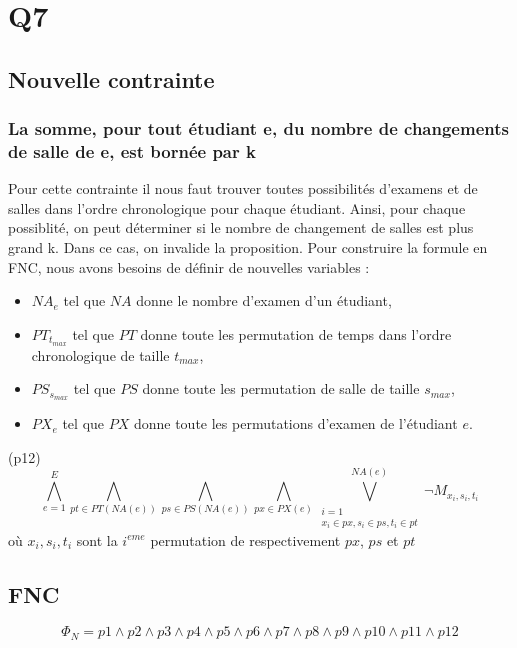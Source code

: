 \documentclass[a4paper,11pt]{article}
\begin{document}
\section{Q7}
\subsection{Nouvelle contrainte}
\subsubsection{La somme, pour tout étudiant e, du nombre de changements de salle de e, est bornée par k}
Pour cette contrainte il nous faut trouver toutes possibilités d'examens et de salles dans l'ordre chronologique pour chaque étudiant. Ainsi, pour chaque possiblité, on peut déterminer si le nombre de changement de salles est plus grand k. Dans ce cas, on invalide la proposition.
Pour construire la formule en FNC, nous avons besoins de définir de nouvelles variables :  
\begin{itemize}
	\item \( NA_{e}\) tel que $NA$ donne le nombre d'examen d'un étudiant,
	\item \( PT_{t_{max}}\) tel que $PT$ donne toute les permutation de temps dans l'ordre chronologique de taille $t_{max}$,
	\item \( PS_{s_{max}}\) tel que $PS$ donne toute les permutation de salle de taille $s_{max}$,
	\item \( PX_{e}\) tel que $PX$ donne toute les permutations d'examen de l'étudiant $e$.
\end{itemize}

(p12)
\begin{displaymath}
	\bigwedge\limits_{e=1}^{E}
	\bigwedge\limits_{pt \in PT(NA(e))}^{}
	\bigwedge\limits_{ps \in PS(NA(e))}^{}
	\bigwedge\limits_{px \in PX(e)}^{}
	\bigvee\limits_{\substack{i=1 \\ x_{i} \in px, s_{i} \in ps, t_{i} \in pt }}^{NA(e)} 
	\neg M_{x_{i}, s_{i}, t_{i}}
\end{displaymath}
où $ x_{i}, s_{i}, t_{i} $ sont la $i^{eme}$ permutation de respectivement $ px$, $ps$ et $pt$

\subsection{FNC}
\begin{displaymath}
	\Phi_{N} = p1 \wedge p2 \wedge p3 \wedge p4 \wedge p5 \wedge p6 \wedge p7 \wedge p8 \wedge p9 \wedge p10 \wedge p11 \wedge p12
\end{displaymath}
	
\end{document}
